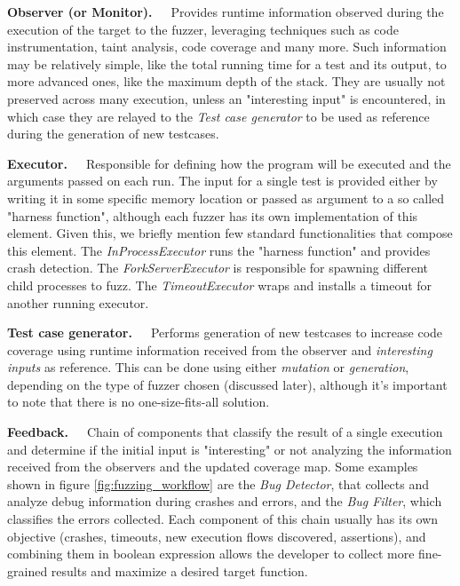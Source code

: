 \textbf{Observer (or Monitor).}\ \ \ Provides runtime information observed during the execution of the target to the fuzzer, leveraging techniques such as code instrumentation, taint analysis, code coverage and many more. Such information may be relatively simple, like the total running time for a test and its output, to more advanced ones, like the maximum depth of the stack. They are usually not preserved across many execution, unless an "interesting input" is encountered, in which case they are relayed to the \textit{Test case generator}  to be used as reference during the generation of new testcases. 

\textbf{Executor.}\ \ \ Responsible for defining how the program will be executed and the arguments passed on each run. The input for a single test is provided either by writing it in some specific memory location or passed as argument to a so called "harness function", although each fuzzer has its own implementation of this element. Given this, we briefly mention few standard functionalities that compose this element. The \textit{InProcessExecutor} runs the "harness function" and provides crash detection. The \textit{ForkServerExecutor} is responsible for spawning different child processes to fuzz. The \textit{TimeoutExecutor} wraps and installs a timeout for another running executor.

\textbf{Test case generator.}\ \ \ Performs generation of new testcases to increase code coverage using runtime information received from the observer and \textit{interesting inputs} as reference. This can be done using either \textit{mutation} or \textit{generation}, depending on the type of fuzzer chosen (discussed later), although it's important to note that there is no one-size-fits-all solution.

\textbf{Feedback.}\ \ \ Chain of components that classify the result of a single execution and determine if the initial input is "interesting" or not analyzing the information received from the observers and the updated coverage map. Some examples shown in figure \ref{fig:fuzzing_workflow} are the \textit{Bug Detector}, that collects and analyze debug information during crashes and errors, and the \textit{Bug Filter}, which classifies the errors collected.
Each component of this chain usually has its own objective (crashes, timeouts, new execution flows discovered, assertions), and combining them in boolean expression allows the developer to collect more fine-grained results and maximize a desired target function.

